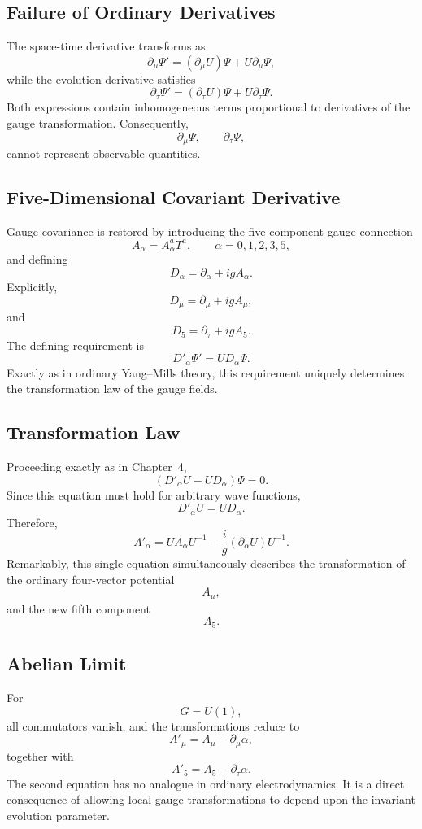 \subsection{Failure of Ordinary Derivatives}
The space-time derivative transforms as
\[\partial_\mu\Psi'=(\partial_\mu U)\Psi+U\partial_\mu\Psi,\]
while the evolution derivative satisfies
\[\partial_\tau\Psi'=(\partial_\tau U)\Psi+U\partial_\tau\Psi.\]
Both expressions contain inhomogeneous terms proportional to derivatives
of the gauge transformation.
Consequently,
\[\partial_\mu\Psi,\qquad\partial_\tau\Psi,\]
cannot represent observable quantities.
\subsection{Five-Dimensional Covariant Derivative}
Gauge covariance is restored by introducing the five-component gauge
connection
\[A_\alpha=A_\alpha^aT^a,\qquad\alpha=0,1,2,3,5,\]
and defining
\[\boxed{D_\alpha=\partial_\alpha+igA_\alpha .}\]
Explicitly,
\[D_\mu=\partial_\mu+igA_\mu,\]
and
\[\boxed{D_5=\partial_\tau+igA_5.}\]
The defining requirement is
\[\boxed{D'_\alpha\Psi'=UD_\alpha\Psi .}\]
Exactly as in ordinary Yang--Mills theory, this requirement uniquely
determines the transformation law of the gauge fields.
\subsection{Transformation Law}
Proceeding exactly as in Chapter~4,
\[(D'_\alpha U-U D_\alpha)\Psi=0.\]
Since this equation must hold for arbitrary wave functions,
\[D'_\alpha U=U D_\alpha.\]
Therefore,
\[\boxed{A'_\alpha=UA_\alpha U^{-1}-\frac{i}{g}(\partial_\alpha U)U^{-1}.}\]
Remarkably,
this single equation simultaneously describes the transformation of the
ordinary four-vector potential
\[A_\mu,\]
and the new fifth component
\[A_5.\]
\subsection{Abelian Limit}
For
\[G=U(1),\]
all commutators vanish,
and the transformations reduce to
\[A'_\mu=A_\mu-\partial_\mu\alpha,\]
together with
\[\boxed{A'_5=A_5-\partial_\tau\alpha.}\]
The second equation has no analogue in ordinary electrodynamics.
It is a direct consequence of allowing local gauge transformations to
depend upon the invariant evolution parameter.

